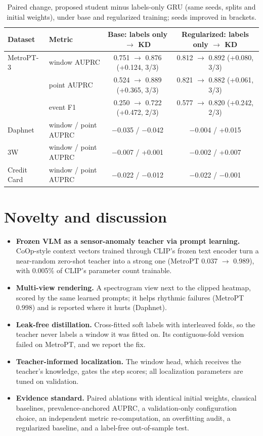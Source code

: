 \documentclass[twoside,english]{article}
\begin{document}
\begin{table}[h]
\centering\small
\caption{Paired change, proposed student minus labels-only GRU (same seeds, splits and initial weights), under base and regularized training; seeds improved in brackets.}
\label{tab:pairedreg}
\begin{tabular}{llcc}
\toprule
Dataset & Metric & Base: labels only $\rightarrow$ KD & Regularized: labels only $\rightarrow$ KD \\
\midrule
MetroPT-3 & window AUPRC & 0.751 $\rightarrow$ 0.876 (+0.124, 3/3) & 0.812 $\rightarrow$ 0.892 (+0.080, 3/3) \\
 & point AUPRC & 0.524 $\rightarrow$ 0.889 (+0.365, 3/3) & 0.821 $\rightarrow$ 0.882 (+0.061, 3/3) \\
 & event F1 & 0.250 $\rightarrow$ 0.722 (+0.472, 2/3) & 0.577 $\rightarrow$ 0.820 (+0.242, 2/3) \\
Daphnet & window / point AUPRC & $-$0.035 / $-$0.042 & $-$0.004 / +0.015 \\
3W & window / point AUPRC & $-$0.007 / +0.001 & $-$0.002 / +0.007 \\
Credit Card & window / point AUPRC & $-$0.022 / $-$0.012 & $-$0.022 / $-$0.001 \\
\bottomrule
\end{tabular}
\end{table}

\section{Novelty and discussion} \label{sec:novelty}
\begin{itemize}[leftmargin=*,nosep]
\item \textbf{Frozen VLM as a sensor-anomaly teacher via prompt learning.} CoOp-style context vectors trained through CLIP's frozen text encoder turn a near-random zero-shot teacher into a strong one (MetroPT 0.037 $\rightarrow$ 0.989), with 0.005\% of CLIP's parameter count trainable.
\item \textbf{Multi-view rendering.} A spectrogram view next to the clipped heatmap, scored by the same learned prompts; it helps rhythmic failures (MetroPT 0.998) and is reported where it hurts (Daphnet).
\item \textbf{Leak-free distillation.} Cross-fitted soft labels with interleaved folds, so the teacher never labels a window it was fitted on. Its contiguous-fold version failed on MetroPT, and we report the fix.
\item \textbf{Teacher-informed localization.} The window head, which receives the teacher's knowledge, gates the step scores; all localization parameters are tuned on validation.
\item \textbf{Evidence standard.} Paired ablations with identical initial weights, classical baselines, prevalence-anchored AUPRC, a validation-only configuration choice, an independent metric re-computation, an overfitting audit, a regularized baseline, and a label-free out-of-sample test.
\end{itemize}
\end{document}
